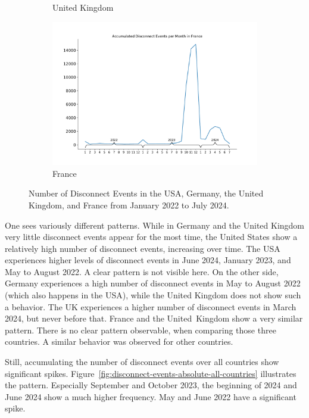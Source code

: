 \begin{figure}
\begin{subfigure}[b]{0.48\linewidth}
		\caption{United Kingdom}
	\end{subfigure}
	\begin{subfigure}[b]{0.48\linewidth}
		\includegraphics[width=\linewidth]{./chapters/4-results/disconnect_events/FR.pdf}
		\caption{France}
	\end{subfigure}
	\caption{Number of Disconnect Events in the USA, Germany, the
		United Kingdom, and France from January 2022 to July 2024.}
	\label{fig:disconnect-events-absolute}
\end{figure}

One sees variously different patterns. While in Germany and the United Kingdom
very little disconnect events appear for the most time, the United States show
a relatively high number of disconnect events, increasing over time. The USA
experiences higher levels of disconnect events in June 2024, January 2023, and
May to August 2022. A clear pattern is not visible here. On the other side,
Germany experiences a high number of disconnect events in May to August 2022
(which also happens in the USA), while the United Kingdom does not show such a
behavior. The UK experiences a higher number of disconnect events in March
2024, but never before that. France and the United~Kingdom show a very similar
pattern. There is no clear pattern observable, when comparing those three
countries. A similar behavior was observed for other countries.

Still, accumulating the number of disconnect events over all countries show
significant spikes. Figure~\ref{fig:disconnect-events-absolute-all-countries}
illustrates the pattern. Especially September and October 2023, the beginning
of 2024 and June 2024 show a much higher frequency. May and June 2022 have a
significant spike.


